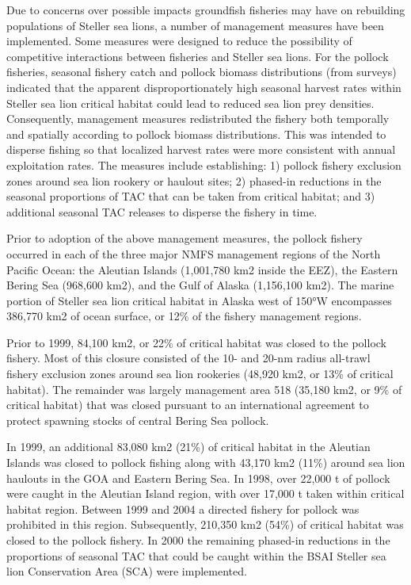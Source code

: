 Due to concerns over possible impacts groundfish fisheries may have on
rebuilding populations of Steller sea lions, a number of management
measures have been implemented. Some measures were designed to reduce
the possibility of competitive interactions between fisheries and
Steller sea lions. For the pollock fisheries, seasonal fishery catch and
pollock biomass distributions (from surveys) indicated that the apparent
disproportionately high seasonal harvest rates within Steller sea lion
critical habitat could lead to reduced sea lion prey densities.
Consequently, management measures redistributed the fishery both
temporally and spatially according to pollock biomass distributions.
This was intended to disperse fishing so that localized harvest rates
were more consistent with annual exploitation rates. The measures
include establishing: 1) pollock fishery exclusion zones around sea lion
rookery or haulout sites; 2) phased-in reductions in the seasonal
proportions of TAC that can be taken from critical habitat; and 3)
additional seasonal TAC releases to disperse the fishery in time.

Prior to adoption of the above management measures, the pollock fishery
occurred in each of the three major NMFS management regions of the North
Pacific Ocean: the Aleutian Islands (1,001,780 km2 inside the EEZ), the
Eastern Bering Sea (968,600 km2), and the Gulf of Alaska (1,156,100
km2). The marine portion of Steller sea lion critical habitat in Alaska
west of 150°W encompasses 386,770 km2 of ocean surface, or 12\% of the
fishery management regions.

Prior to 1999, 84,100 km2, or 22\% of critical habitat was closed to the
pollock fishery. Most of this closure consisted of the 10- and 20-nm
radius all-trawl fishery exclusion zones around sea lion rookeries
(48,920 km2, or 13\% of critical habitat). The remainder was largely
management area 518 (35,180 km2, or 9\% of critical habitat) that was
closed pursuant to an international agreement to protect spawning stocks
of central Bering Sea pollock.

In 1999, an additional 83,080 km2 (21\%) of critical habitat in the
Aleutian Islands was closed to pollock fishing along with 43,170 km2
(11\%) around sea lion haulouts in the GOA and Eastern Bering Sea. In
1998, over 22,000 t of pollock were caught in the Aleutian Island
region, with over 17,000 t taken within critical habitat region. Between
1999 and 2004 a directed fishery for pollock was prohibited in this
region. Subsequently, 210,350 km2 (54\%) of critical habitat was closed
to the pollock fishery. In 2000 the remaining phased-in reductions in
the proportions of seasonal TAC that could be caught within the BSAI
Steller sea lion Conservation Area (SCA) were implemented.

